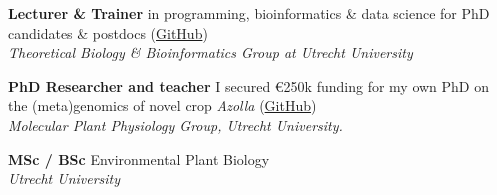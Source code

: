 \documentclass[a4paper,10pt]{article}
\begin{document}
{\begin{adjustbox}{valign=t}
\hfill%
\begin{minipage}[t]{0.6\textwidth}


\begin{description}
\raggedright
  \item[\normalfont \textcolor{ForestGreen}{\textbf{2022 -- now.}}] \textbf{Lecturer \&  Trainer} 
    in programming, bioinformatics \& data science for PhD candidates \& postdocs 
    (\href{https://github.com/lauralwd/professional_education}{GitHub})\\
    \textit{Theoretical Biology \& Bioinformatics Group at Utrecht University}
  \item[\normalfont \textcolor{ForestGreen}{\textbf{2017 -- 2022.}}] \textbf{PhD Researcher and teacher} 
    I secured €250k funding for my own PhD on the (meta)genomics of novel crop \textit{Azolla} 
    (\href{https://github.com/lauralwd/azolla_phd_thesis}{GitHub})\\ 
    \textit{Molecular Plant Physiology Group, Utrecht University.}
  \item[\normalfont \textcolor{ForestGreen}{\textbf{2010 -- 2017.}}] \textbf{MSc / BSc} Environmental Plant Biology \\
    \textit{Utrecht University}
\end{description}



\end{minipage}
\end{adjustbox}}
\end{document}
